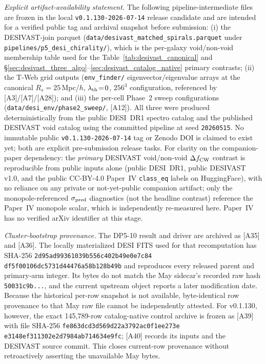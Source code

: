 \documentclass[aps,prd,twocolumn,superscriptaddress,showpacs,preprintnumbers,nofootinbib,longbibliography,floatfix]{revtex4-2}
\newcommand{\paperVersion}{v0.1.130-2026-07-14}
\begin{document}
\emph{Explicit artifact-availability statement.}
The following pipeline-intermediate files are frozen in the local
\texttt{\paperVersion} release candidate and are intended for a verified
public tag and archival snapshot before submission:
(i) the DESIVAST-join parquet
(\texttt{data/desivast\_matched\_spirals.parquet} under
\texttt{pipelines/p5\_desi\_chirality/}),
which is the per-galaxy void/non-void membership table used for the
Table~\ref{tab:desivast_canonical} and
\S\ref{sec:desivast_three_algo}--\ref{sec:desivast_catalog_native}
primary contrasts;
(ii) the T-Web grid outputs
(\texttt{env\_finder/} eigenvector/eigenvalue arrays at the
canonical $R_s\!=\!25$\,Mpc/$h$, $\lambda_{\rm th}\!=\!0$, $256^3$
configuration, referenced by [A3]/[A7]/[A28]);
and (iii) the per-cell Phase~2 sweep configurations
(\texttt{data/desi\_env/phase2\_sweep/}, [A12]).
All three were produced deterministically from the public DESI~DR1
spectro catalog and the published DESIVAST void catalog using the
committed pipeline at seed \texttt{20260515}.
No immutable public \texttt{\paperVersion} tag or Zenodo DOI is claimed to
exist yet; both are explicit pre-submission release tasks. For clarity on the
companion-paper dependency: the \emph{primary} DESIVAST void/non-void
$\Delta f_{\rm CW}$ contrast is reproducible from public inputs alone
(public DESI~DR1, public DESIVAST v1.0, and the public CC-BY-4.0 Paper~IV
\texttt{class\_eq} labels on HuggingFace), with no reliance on any private
or not-yet-public companion artifact; only the monopole-referenced
$\sigma_{\rm pred}$ diagnostics (not the headline contrast) reference the
Paper~IV monopole scalar, which is independently re-measured here.
Paper~IV has no verified arXiv identifier at this stage.

\emph{Cluster-bootstrap provenance.} The DP5-10 result and driver are
archived as [A35] and [A36]. The locally materialized DESI FITS used for
that recomputation has SHA-256
\texttt{2d95ad99361039b5}\allowbreak\texttt{56c402b49e0e7c84}\allowbreak
\texttt{df5f00106dc5731d}\allowbreak\texttt{44476a58b128b49b}
and reproduces every released parent and primary-arm integer. Its bytes
do not match the May sidecar's recorded raw hash
\texttt{50031c9b...}, and the current upstream object reports a later
modification date. Because the historical per-row snapshot is not
available, byte-identical row provenance to that May raw file cannot be
independently attested. For v0.1.130, however, the exact 145,789-row
catalog-native control archive is frozen as [A39] with file SHA-256
\texttt{fe863dcd3d569d22a3792ac0f1ee273e}
\texttt{e3148ef311302e2d7984ab714634e9fc}; [A40] records its inputs and the
DESIVAST source commit. This closes current-row provenance without
retroactively asserting the unavailable May bytes.
\end{document}
